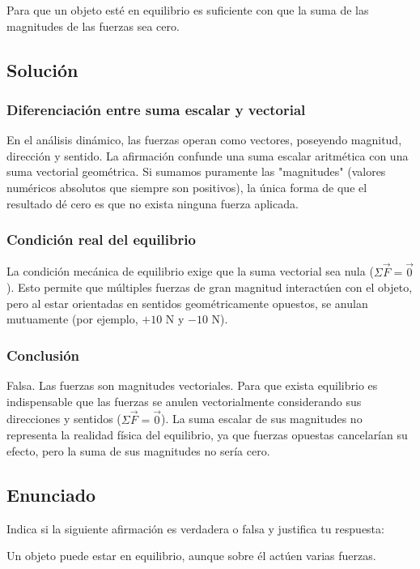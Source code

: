 \documentclass[12pt, a4paper]{article}
\begin{document}
Para que un objeto esté en equilibrio es suficiente con que la suma de las magnitudes de las fuerzas sea cero.

\subsection*{Solución}

\subsubsection*{Diferenciación entre suma escalar y vectorial}
En el análisis dinámico, las fuerzas operan como vectores, poseyendo magnitud, dirección y sentido. La afirmación confunde una suma escalar aritmética con una suma vectorial geométrica. Si sumamos puramente las "magnitudes" (valores numéricos absolutos que siempre son positivos), la única forma de que el resultado dé cero es que no exista ninguna fuerza aplicada.

\subsubsection*{Condición real del equilibrio}
La condición mecánica de equilibrio exige que la suma vectorial sea nula ($\Sigma\vec{F} = \vec{0}$). Esto permite que múltiples fuerzas de gran magnitud interactúen con el objeto, pero al estar orientadas en sentidos geométricamente opuestos, se anulan mutuamente (por ejemplo, $+10 \text{ N}$ y $-10 \text{ N}$).

\subsubsection*{Conclusión}
Falsa. Las fuerzas son magnitudes vectoriales. Para que exista equilibrio es indispensable que las fuerzas se anulen vectorialmente considerando sus direcciones y sentidos ($\Sigma\vec{F} = \vec{0}$). La suma escalar de sus magnitudes no representa la realidad física del equilibrio, ya que fuerzas opuestas cancelarían su efecto, pero la suma de sus magnitudes no sería cero.

\newpage
\subsection*{Enunciado}
Indica si la siguiente afirmación es verdadera o falsa y justifica tu respuesta: 

Un objeto puede estar en equilibrio, aunque sobre él actúen varias fuerzas.
\end{document}

